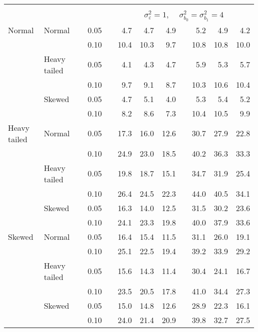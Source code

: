 \begin{table}[ht]
\begin{scriptsize}
\begin{center}
\begin{tabular}{ll p{.1cm} c p{.1cm} rrr p{.1cm} rrr}
&&&&&&&&&&&\\
& && && \multicolumn{7}{c}{$\sigma_{\varepsilon}^2 = 1$, \ \ $\sigma_{b_0}^2 = \sigma_{b_1}^2 = 4$} \\ \cline{6-12}
Normal       & Normal       && 0.05 &&   4.7 & 4.7 & 4.9 &   & 5.2 & 4.9 & 4.2 \\ 
             &              && 0.10 &&   10.4 & 10.3 & 9.7 &   & 10.8 & 10.8 & 10.0 \\ 
             & Heavy tailed && 0.05 &&   4.1 & 4.3 & 4.7 &   & 5.9 & 5.3 & 5.7 \\ 
             &              && 0.10 &&   9.7 & 9.1 & 8.7 &   & 10.3 & 10.6 & 10.4 \\ 
             & Skewed       && 0.05 &&   4.7 & 5.1 & 4.0 &   & 5.3 & 5.4 & 5.2 \\ 
             &              && 0.10 &&   8.2 & 8.6 & 7.3 &   & 10.4 & 10.5 & 9.9 \\ 
Heavy tailed & Normal       && 0.05 &&   17.3 & 16.0 & 12.6 &   & 30.7 & 27.9 & 22.8 \\ 
             &              && 0.10 &&   24.9 & 23.0 & 18.5 &   & 40.2 & 36.3 & 33.3 \\ 
             & Heavy tailed && 0.05 &&   19.8 & 18.7 & 15.1 &   & 34.7 & 31.9 & 25.4 \\ 
             &              && 0.10 &&   26.4 & 24.5 & 22.3 &   & 44.0 & 40.5 & 34.1 \\ 
             & Skewed       && 0.05 &&   16.3 & 14.0 & 12.5 &   & 31.5 & 30.2 & 23.6 \\ 
             &              && 0.10 &&   24.1 & 23.3 & 19.8 &   & 40.0 & 37.9 & 33.6 \\ 
Skewed       & Normal       && 0.05 &&   16.4 & 15.4 & 11.5 &   & 31.1 & 26.0 & 19.1 \\ 
             &              && 0.10 &&   25.1 & 22.5 & 19.4 &   & 39.2 & 33.9 & 29.2 \\ 
             & Heavy tailed && 0.05 &&   15.6 & 14.3 & 11.4 &   & 30.4 & 24.1 & 16.7 \\ 
             &              && 0.10 &&   23.5 & 20.5 & 17.8 &   & 41.0 & 34.4 & 27.3 \\ 
             & Skewed       && 0.05 &&   15.0 & 14.8 & 12.6 &   & 28.9 & 22.3 & 16.1 \\ 
             &              && 0.10 &&   24.0 & 21.4 & 20.9 &   & 39.8 & 32.7 & 27.5 \\ 

\hline
\end{tabular}
\end{center}
\end{scriptsize}
\end{table}